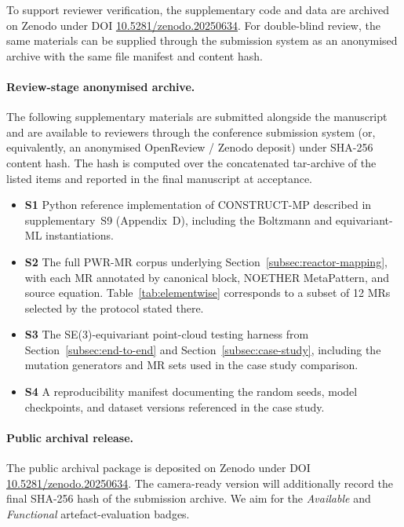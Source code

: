 \documentclass[manuscript]{acmart}
\begin{document}
To support reviewer verification, the supplementary code and data are archived
on Zenodo under DOI \href{https://doi.org/10.5281/zenodo.20250634}{10.5281/zenodo.20250634}.
For double-blind review, the same materials can be supplied through the
submission system as an anonymised archive with the same file manifest and
content hash.

\paragraph{Review-stage anonymised archive.} The following supplementary materials are submitted alongside the manuscript and are available to reviewers through the conference submission system (or, equivalently, an anonymised OpenReview / Zenodo deposit) under SHA-256 content hash. The hash is computed over the concatenated tar-archive of the listed items and reported in the final manuscript at acceptance.
\begin{itemize}
    \item \textbf{S1} Python reference implementation of CONSTRUCT-MP described in supplementary~S9 (Appendix~D), including the Boltzmann and equivariant-ML instantiations.
    \item \textbf{S2} The full PWR-MR corpus underlying Section~\ref{subsec:reactor-mapping}, with each MR annotated by canonical block, NOETHER MetaPattern, and source equation. Table~\ref{tab:elementwise} corresponds to a subset of 12 MRs selected by the protocol stated there.
    \item \textbf{S3} The SE(3)-equivariant point-cloud testing harness from Section~\ref{subsec:end-to-end} and Section~\ref{subsec:case-study}, including the mutation generators and MR sets used in the case study comparison.
    \item \textbf{S4} A reproducibility manifest documenting the random seeds, model checkpoints, and dataset versions referenced in the case study.
\end{itemize}

\paragraph{Public archival release.} The public archival package is deposited
on Zenodo under DOI
\href{https://doi.org/10.5281/zenodo.20250634}{10.5281/zenodo.20250634}. The
camera-ready version will additionally record the final SHA-256 hash of the
submission archive. We aim for the \emph{Available} and \emph{Functional}
artefact-evaluation badges.
\end{document}
